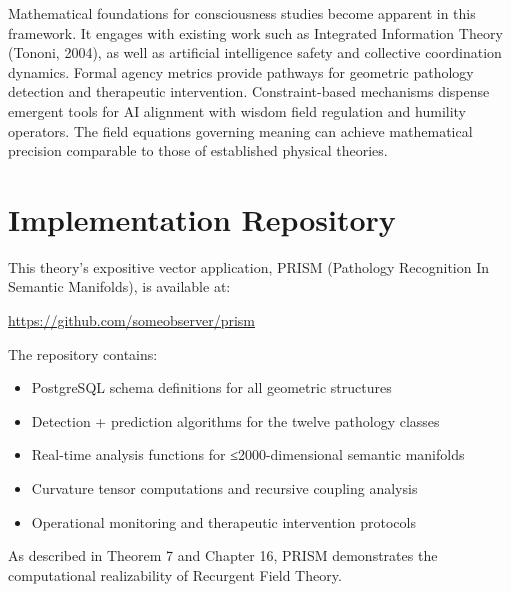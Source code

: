 \documentclass[11pt, a4paper]{report}
\begin{document}
\vspace{1em}

Mathematical foundations for consciousness studies become apparent in this framework. It engages with existing work such as Integrated Information Theory (Tononi, 2004), as well as artificial intelligence safety and collective coordination dynamics. Formal agency metrics provide pathways for geometric pathology detection and therapeutic intervention. Constraint-based mechanisms dispense emergent tools for AI alignment with wisdom field regulation and humility operators. The field equations governing meaning can achieve mathematical precision comparable to those of established physical theories.

\tableofcontents

















\appendix
\chapter{Implementation Repository}
\label{appendix:implementation}

This theory's expositive vector application, PRISM (Pathology Recognition In Semantic Manifolds), is available at:

\begin{center}
\url{https://github.com/someobserver/prism}
\end{center}

The repository contains:
\begin{itemize}
\item PostgreSQL schema definitions for all geometric structures
\item Detection + prediction algorithms for the twelve pathology classes
\item Real-time analysis functions for ≤2000-dimensional semantic manifolds
\item Curvature tensor computations and recursive coupling analysis
\item Operational monitoring and therapeutic intervention protocols
\end{itemize}

As described in Theorem 7 and Chapter 16, PRISM demonstrates the computational realizability of Recurgent Field Theory.

\printbibliography
\end{document}

